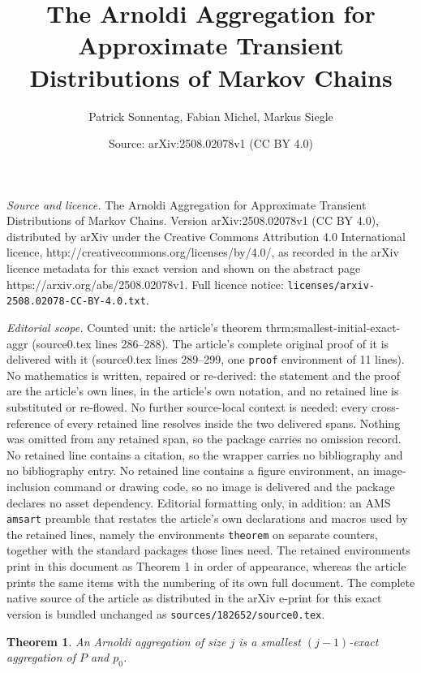 \documentclass[10pt,a4paper]{amsart}
\title{The Arnoldi Aggregation for Approximate Transient Distributions of Markov Chains}
\author{Patrick Sonnentag, Fabian Michel, Markus Siegle}
\date{Source: arXiv:2508.02078v1 (CC BY 4.0)}
\newtheorem{theorem}{Theorem}
\begin{document}
\maketitle

\noindent\emph{Source and licence.} The Arnoldi Aggregation for Approximate Transient Distributions of Markov Chains. Version arXiv:2508.02078v1 (CC BY 4.0), distributed by arXiv under the Creative Commons Attribution 4.0 International licence, http://creativecommons.org/licenses/by/4.0/, as recorded in the arXiv licence metadata for this exact version and shown on the abstract page https://arxiv.org/abs/2508.02078v1. Full licence notice: \texttt{licenses/arxiv-2508.02078-CC-BY-4.0.txt}.\par\smallskip

\noindent\textit{Editorial scope.} Counted unit: the article's theorem thrm:smallest-initial-exact-aggr (source0.tex lines 286--288). The article's complete original proof of it is delivered with it (source0.tex lines 289--299, one \texttt{proof} environment of 11 lines). No mathematics is written, repaired or re-derived: the statement and the proof are the article's own lines, in the article's own notation, and no retained line is substituted or re-flowed.  No further source-local context is needed: every cross-reference of every retained line resolves inside the two delivered spans.  Nothing was omitted from any retained span, so the package carries no omission record.  No retained line contains a citation, so the wrapper carries no bibliography and no bibliography entry.  No retained line contains a figure environment, an image-inclusion command or drawing code, so no image is delivered and the package declares no asset dependency.  Editorial formatting only, in addition: an AMS \texttt{amsart} preamble that restates the article's own declarations and macros used by the retained lines, namely the environments \texttt{theorem} on separate counters, together with the standard packages those lines need.  The retained environments print in this document as Theorem 1 in order of appearance, whereas the article prints the same items with the numbering of its own full document.  The complete native source of the article as distributed in the arXiv e-print for this exact version is bundled unchanged as \texttt{sources/182652/source0.tex}.
\begin{theorem}\label{thrm:smallest-initial-exact-aggr}
    An Arnoldi aggregation of size $j$ is a smallest $(j - 1)$-exact aggregation of $P$ and $p_0$.
\end{theorem}
\end{document}

